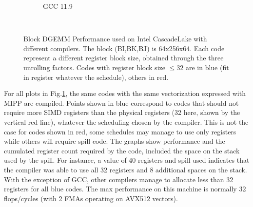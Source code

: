 \documentclass[sigconf,review]{acmart}
\begin{document}
\begin{figure}[ht]
\begin{subfigure}[h]{0.45\textwidth}
  \caption{GCC 11.9}
  \end{subfigure}\hfill ~
  \caption{Block DGEMM Performance used on Intel CascadeLake with different compilers. The block (BI,BK,BJ) is 64x256x64. Each code represent a different register block size, obtained through the three unrolling factors. Codes with register block size $\leq 32$ are in blue (fit in register whatever the schedule), others in red.  \label{fig:cascadelake}}
\end{figure}
 For all plots in Fig.\ref{fig:cascadelake}, the same codes with the same vectorization expressed with MIPP are
compiled. Points shown in blue correspond to codes that should not require
more SIMD registers than the physical registers (32 here, shown by the vertical red line), whatever
the scheduling chosen by the compiler. This is not the case for codes
shown in red, some schedules may manage to use only registers while
others will require spill code. The graphs show performance and the
cumulated register count required by the code, included the space on
the stack used by the spill. For instance, a value of 40 registers and
spill used indicates that the compiler was able to use all 32
registers and 8 additional spaces on the stack. With the exception of
GCC, other compilers manage to allocate less than 32 registers for all
blue codes. The max performance on this machine is normally 32 flops/cycles (with 2 FMAs operating on AVX512 vectors).  
\end{document}

